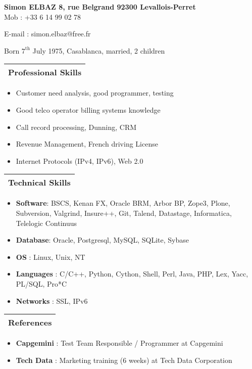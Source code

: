 \documentclass[a4paper,11pt]{article}
\begin{document}
\textbf{Simon ELBAZ 8, rue Belgrand 92300 Levallois-Perret} \\

Mob :    +33 6 14 99 02 78

E-mail : simon.elbaz@free.fr

Born $7^\mathrm{th}$ July 1975, Casablanca, married, 2 children

\bigskip

\begin{tabular}{p{\textwidth}}
\hline
\textbf{Professional Skills}\\
\hline
\end{tabular}
\begin{itemize}
\item    Customer need analysis, good programmer, testing
\item    Good telco operator billing systems knowledge 
\item    Call record processing, Dunning, CRM
\item    Revenue Management, French driving License
\item    Internet Protocols (IPv4, IPv6), Web 2.0
\end{itemize}
\bigskip

\begin{tabular}{p{\textwidth}}
\hline
\textbf{Technical Skills}\\
\hline
\end{tabular}
\begin{itemize}
\item    \textbf{Software}: BSCS, Kenan FX, Oracle BRM, Arbor BP, Zope3, Plone, Subversion, Valgrind, Insure++, Git, Talend, Datastage, Informatica, Telelogic Continuus
\item    \textbf{Database}: Oracle, Postgresql, MySQL, SQLite, Sybase
\item    \textbf{OS} : Linux, Unix, NT
\item    \textbf{Languages} : C/C++, Python, Cython, Shell, Perl, Java, PHP, Lex, Yacc, PL/SQL, Pro*C
\item    \textbf{Networks} : SSL, IPv6
\end{itemize}
\bigskip

\begin{tabular}{p{\textwidth}}
\hline
\textbf{References}\\
\hline
\end{tabular}
\begin{itemize}
\item \textbf{Capgemini} : Test Team Responsible / Programmer at Capgemini
\item \textbf{Tech Data} : Marketing training (6 weeks) at Tech Data Corporation
\end{itemize}
\bigskip
\end{document}
